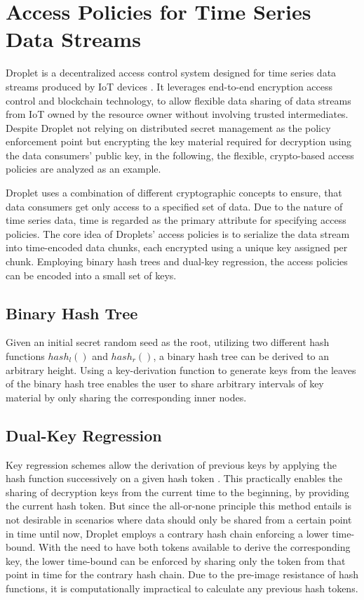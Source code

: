 \documentclass[conference]{IEEEtran}
\begin{document}
\section{Access Policies for Time Series Data Streams}
Droplet \cite{shafagh_droplet_2020} is a decentralized access control system designed for time series data streams produced by IoT devices \cite{zhang_cloud_2015}.
It leverages end-to-end encryption access control and blockchain technology, to allow flexible data sharing of data streams from IoT owned by the resource owner without involving trusted intermediates.
Despite Droplet not relying on distributed secret management as the policy enforcement point but encrypting the key material required for decryption using the data consumers' public key, in the following, the flexible, crypto-based access policies are analyzed as an example.

Droplet uses a combination of different cryptographic concepts to ensure, that data consumers get only access to a specified set of data.
Due to the nature of time series data, time is regarded as the primary attribute for specifying access policies.
The core idea of Droplets' access policies is to serialize the data stream into time-encoded data chunks, each encrypted using a unique key assigned per chunk.
Employing binary hash trees and dual-key regression, the access policies can be encoded into a small set of keys.

\subsection{Binary Hash Tree}
Given an initial secret random seed as the root, utilizing two different hash functions $hash_l()$ and $hash_r()$, a binary hash tree can be derived to an arbitrary height.
Using a key-derivation function to generate keys from the leaves of the binary hash tree enables the user to share arbitrary intervals of key material by only sharing the corresponding inner nodes.

\subsection{Dual-Key Regression}
Key regression schemes allow the derivation of previous keys by applying the hash function successively on a given hash token \cite{fu_key_2005, shafagh_droplet_2020}.
This practically enables the sharing of decryption keys from the current time to the beginning, by providing the current hash token.
But since the all-or-none principle this method entails is not desirable in scenarios where data should only be shared from a certain point in time until now, Droplet employs a contrary hash chain enforcing a lower time-bound.
With the need to have both tokens available to derive the corresponding key, the lower time-bound can be enforced by sharing only the token from that point in time for the contrary hash chain.
Due to the pre-image resistance of hash functions, it is computationally impractical to calculate any previous hash tokens.
\end{document}
